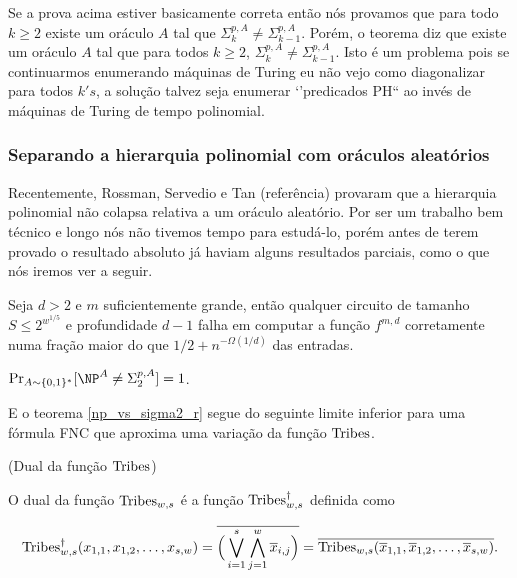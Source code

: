 \color{red}

Se a prova acima estiver basicamente correta então nós provamos que para todo $k \geq 2$ existe um oráculo $A$ tal que $\Sigma_{k}^{p, A} \neq \Sigma_{k - 1}^{p, A}$. Porém, o teorema diz que existe um oráculo $A$ tal que para todos $k \geq 2$, $\Sigma_{k}^{p, A} \neq \Sigma_{k - 1}^{p, A}$. Isto é um problema pois se continuarmos enumerando máquinas de Turing eu não vejo como diagonalizar para todos $k's$, a solução talvez seja enumerar `'predicados PH`` ao invés de máquinas de Turing de tempo polinomial.

\color{black}

\subsubsection{Separando a hierarquia polinomial com oráculos aleatórios}

Recentemente, Rossman, Servedio e Tan (referência) provaram que a hierarquia polinomial não colapsa relativa a um oráculo aleatório. Por ser um trabalho bem técnico e longo nós não tivemos tempo para estudá-lo, porém antes de terem provado o resultado absoluto já haviam alguns resultados parciais, como o que nós iremos ver a seguir.

\begin{teo} \label{Sipser_f_lb_app}

Seja $d > 2$ e $m$ suficientemente grande, então qualquer circuito de tamanho $S \leq 2^{w^{1/5}}$ e profundidade $d - 1$ falha em computar a função $f^{m, d}$ corretamente numa fração maior do que $1/2 + n^{-\Omega(1/d)}$ das entradas.

\end{teo}

\begin{teo} \label{np_vs_sigma2_r}
	$\Pr_{A \sim \binalph^{*}}[\NP^{A} \neq \Sigma_{2}^{p, A}] = 1$.
\end{teo}

E o teorema \ref{np_vs_sigma2_r} segue do seguinte limite inferior para uma fórmula FNC que aproxima uma variação da função $\text{Tribes}$.

\begin{defi} (Dual da função $\text{Tribes}$)

O dual da função $\text{Tribes}_{w, s}$ é a função $\text{Tribes}_{w, s}^{\dagger}$ definida como

\begin{equation*}
	\text{Tribes}_{w, s}^{\dagger}(x_{1, 1}, x_{1,2}, \dots, x_{s, w})  = \overline{\Big(\bigvee_{i = 1}^{s}\bigwedge_{j = 1}^{w} \overline{x}_{i, j}\Big)} = \overline{\text{Tribes}_{w, s}(\overline{x}_{1, 1}, \overline{x}_{1, 2}, \dots, \overline{x}_{s, w})}.
\end{equation*}

\end{defi}

